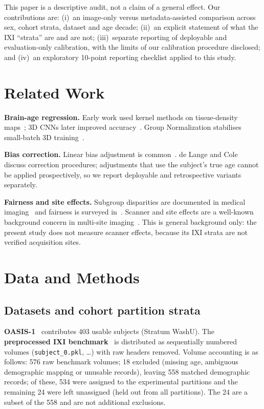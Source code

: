 \documentclass[runningheads]{llncs}
\begin{document}
This paper is a descriptive audit, not a claim of a general effect. Our contributions are: (i)~an image-only versus metadata-assisted comparison across sex, cohort strata, dataset and age decade; (ii)~an explicit statement of what the IXI ``strata'' are and are not; (iii)~separate reporting of deployable and evaluation-only calibration, with the limits of our calibration procedure disclosed; and (iv)~an exploratory 10-point reporting checklist applied to this study.

\section{Related Work}
\textbf{Brain-age regression.} Early work used kernel methods on tissue-density maps~\cite{franke2010cross}; 3D CNNs later improved accuracy~\cite{cole2017predicting,peng2021accurate}. Group Normalization stabilises small-batch 3D training~\cite{wu2018group}.

\textbf{Bias correction.} Linear bias adjustment is common~\cite{beheshti2019bias}. de Lange and Cole~\cite{de2020bias} discuss correction procedures; adjustments that use the subject's true age cannot be applied prospectively, so we report deployable and retrospective variants separately.

\textbf{Fairness and site effects.} Subgroup disparities are documented in medical imaging~\cite{seyyed2020underdiagnosis} and fairness is surveyed in~\cite{mehrabi2021survey}. Scanner and site effects are a well-known background concern in multi-site imaging~\cite{fortin2018harmonization}. This is general background only: the present study does not measure scanner effects, because its IXI strata are not verified acquisition sites.

\section{Data and Methods}
\subsection{Datasets and cohort partition strata}
\textbf{OASIS-1}~\cite{marcus2007open} contributes 403 usable subjects (Stratum WashU). The \textbf{preprocessed IXI benchmark}~\cite{chen2022transmorph,ixi_dataset} is distributed as sequentially numbered volumes (\texttt{subject\_0.pkl}, \ldots) with raw headers removed. Volume accounting is as follows: 576 raw benchmark volumes; 18 excluded (missing age, ambiguous demographic mapping or unusable records), leaving 558 matched demographic records; of these, 534 were assigned to the experimental partitions and the remaining 24 were left unassigned (held out from all partitions). The 24 are a subset of the 558 and are not additional exclusions.
\end{document}

